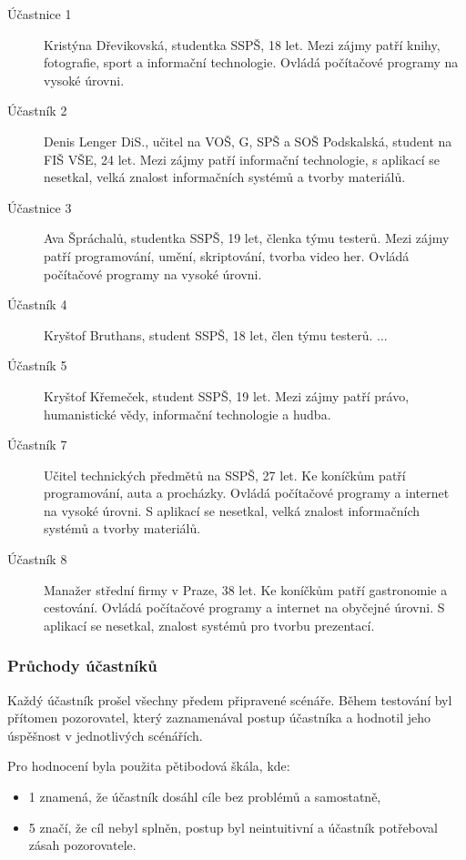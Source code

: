 \begin{description}
\item[Účastnice 1] Kristýna Dřevikovská, studentka SSPŠ, 18 let. Mezi zájmy patří knihy, fotografie, sport a informační technologie. Ovládá počítačové programy na vysoké úrovni.
\item[Účastník 2] Denis Lenger DiS., učitel na VOŠ, G, SPŠ a SOŠ Podskalská, student na FIŠ VŠE, 24 let. Mezi zájmy patří informační technologie, s aplikací se nesetkal, velká znalost informačních systémů a tvorby materiálů.
\item[Účastnice 3] Ava Špráchalů, studentka SSPŠ, 19 let, členka týmu testerů. Mezi zájmy patří programování, umění, skriptování, tvorba video her. Ovládá počítačové programy na vysoké úrovni.
\item[Účastník 4] Kryštof Bruthans, student SSPŠ, 18 let, člen týmu testerů. ...
\item[Účastník 5] Kryštof Křemeček, student SSPŠ, 19 let. Mezi zájmy patří právo, humanistické vědy, informační technologie a hudba.
\item[Účastník 7] Učitel technických předmětů na SSPŠ, 27 let. Ke koníčkům patří programování, auta a procházky. Ovládá počítačové programy a internet na vysoké úrovni. S aplikací se nesetkal, velká znalost informačních systémů a tvorby materiálů.
\item[Účastník 8] Manažer střední firmy v Praze, 38 let. Ke koníčkům patří gastronomie a cestování. Ovládá počítačové programy a internet na obyčejné úrovni. S aplikací se nesetkal, znalost systémů pro tvorbu prezentací.
\end{description}

\subsubsection{Průchody účastníků}

Každý účastník prošel všechny předem připravené scénáře.
Během testování byl přítomen pozorovatel, který zaznamenával postup účastníka a hodnotil jeho úspěšnost v jednotlivých scénářích. 

Pro hodnocení byla použita pětibodová škála, kde:

\begin{itemize}
      \item 1 znamená, že účastník dosáhl cíle bez problémů a samostatně,
      \item 5 značí, že cíl nebyl splněn, postup byl neintuitivní a účastník potřeboval zásah pozorovatele.
\end{itemize}

